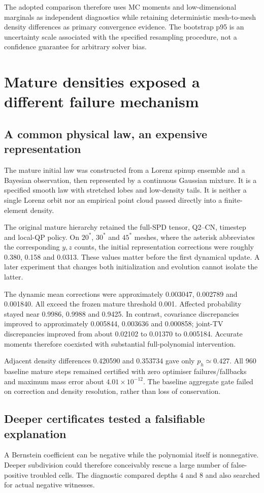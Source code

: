 The adopted comparison therefore uses MC moments and low-dimensional marginals as independent diagnostics while retaining deterministic mesh-to-mesh density differences as primary convergence evidence. The bootstrap p95 is an uncertainty scale associated with the specified resampling procedure, not a confidence guarantee for arbitrary solver bias.

\chapter{Mature densities exposed a different failure mechanism}
\section{A common physical law, an expensive representation}
The mature initial law was constructed from a Lorenz spinup ensemble and a Bayesian observation, then represented by a continuous Gaussian mixture. It is a specified smooth law with stretched lobes and low-density tails. It is neither a single Lorenz orbit nor an empirical point cloud passed directly into a finite-element density.

The original mature hierarchy retained the full-SPD tensor, Q2--CN, timestep and local-QP policy. On $20^*$, $30^*$ and $45^*$ meshes, where the asterisk abbreviates the corresponding $y,z$ counts, the initial representation corrections were roughly 0.380, 0.158 and 0.0313. These values matter before the first dynamical update. A later experiment that changes both initialization and evolution cannot isolate the latter.

The dynamic mean corrections were approximately 0.003047, 0.002789 and 0.001840. All exceed the frozen mature threshold 0.001. Affected probability stayed near 0.9986, 0.9988 and 0.9425. In contrast, covariance discrepancies improved to approximately 0.005844, 0.003636 and 0.000858; joint-TV discrepancies improved from about 0.02102 to 0.01370 to 0.005184. Accurate moments therefore coexisted with substantial full-polynomial intervention.

Adjacent density differences 0.420590 and 0.353734 gave only $p_h\simeq0.427$. All 960 baseline mature steps remained certified with zero optimiser failures/fallbacks and maximum mass error about $4.01\times10^{-12}$. The baseline aggregate gate failed on correction and density resolution, rather than loss of conservation.

\section{Deeper certificates tested a falsifiable explanation}
A Bernstein coefficient can be negative while the polynomial itself is nonnegative. Deeper subdivision could therefore conceivably rescue a large number of false-positive troubled cells. The diagnostic compared depths 4 and 8 and also searched for actual negative witnesses.

